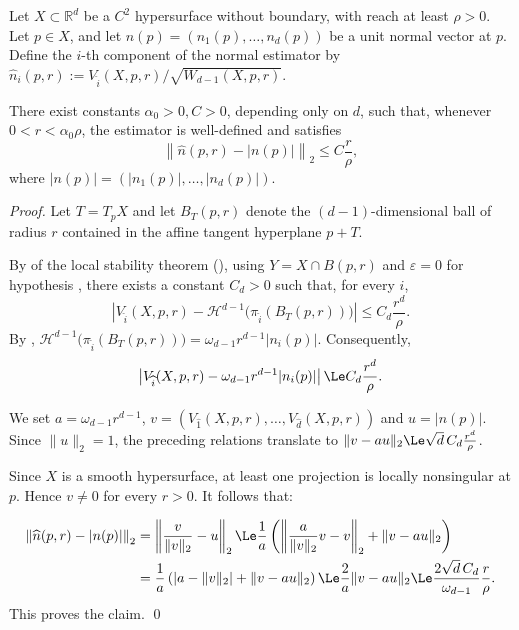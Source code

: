 \begin{corollary}%
\label{cor:local-normal-estimation}
Let $X\subset\mathbb R^d$ be a $C^2$ hypersurface
without boundary, with reach at least $\rho>0$.
Let $p\in X$, and let
$n(p)=(n_1(p),\ldots,n_d(p))$
be a unit normal vector at $p$.
Define the $i$-th component of the  normal estimator by
\( \widehat n_i(p,r)
:=
V_{\widehat{i}}(X,p,r) / \sqrt{W_{d-1}(X,p,r)}.
\)

There exist constants $\alpha_0>0,C>0$, depending
only on $d$, such that, whenever
$0<r<\alpha_0\rho$, the estimator is well-defined
and satisfies
\[
\left\| \widehat n(p,r)-|n(p)| \right\|_2
\le C\frac r\rho,
\]
where \(|n(p)|=(|n_1(p)|,\ldots,|n_d(p)|). \)
\end{corollary}

\begin{proof}
Let $T=T_pX$ and let $B_T(p,r)$ denote the
$(d-1)$-dimensional ball of radius $r$
contained in the affine tangent hyperplane
$p+T$.

By  of the local stability theorem
(), using $Y=X \cap B(p,r)$ and
$\varepsilon=0$ for hypothesis , there exists a
constant $C_d>0$ such that, for every $i$,
\[
\left|
V_{\widehat{i}}(X,p,r)
- \mathcal H^{d-1}
\bigl(\pi_{\widehat i}(B_T(p,r))\bigr)
\right|
\le
C_d\frac{r^d}{\rho}.
\]
By , 
\(
\mathcal H^{d-1}
\bigl(\pi_{\widehat i}(B_T(p,r))\bigr)
=
\omega_{d-1}r^{d-1}|n_i(p)|.
\)
Consequently, \[\left|V_{\widehat{i}}(X,p,r)-\omega_{d-1}r^{d-1}|n_i(p)|\right| \Le C_d\frac{r^d}{\rho}.\]

We set $a=\omega_{d-1}r^{d-1}$,
$v=(V_{\widehat{1}}(X,p,r),\ldots,V_{\widehat{d}}(X,p,r))$ and
$u=|n(p)|$.  Since $\|u\|_2=1$, the preceding relations translate to
$\|v-au\|_2 \Le \sqrt d\,C_d\frac{r^d}{\rho}$.

Since \(X\) is a smooth hypersurface, at least one projection is
locally nonsingular at \(p\). Hence \(v\ne0\) for every \(r>0\).
It follows that:

\begin{align*}
\left\|\widehat n(p,r)-|n(p)|\right\|_2
&= \left\|
\frac{v}{\|v\|_2}-u
\right\|_2
\Le \frac{1}{a}\left(\left\| \frac{a}{\|v\|_2}v - v \right\|_2 + \|v-au\|_2 \right) \\
&= \frac{1}{a}\left(|a-\|v\|_2| + \|v-au\|_2 \right) \Le \frac{2}{a}\|v-au\|_2 \Le \frac{2\sqrt d\,C_d}
{\omega_{d-1}}
\frac r\rho. 
\end{align*}
This proves the claim. \qed
\end{proof}


